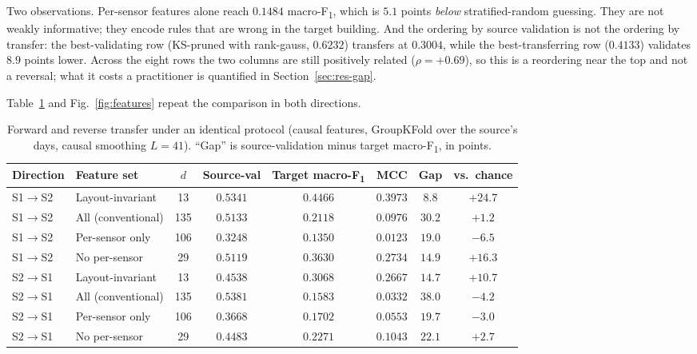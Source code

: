\documentclass[a4paper,fleqn]{cas-dc}
\newcommand{\macf}{macro-F\textsubscript{1}}
\begin{document}
Two observations. Per-sensor features alone reach $0.1484$ \macf, which is $5.1$ points
\emph{below} stratified-random guessing. They are not weakly informative; they encode
rules that are wrong in the target building. And the ordering by source validation is not
the ordering by transfer: the best-validating row (KS-pruned with rank-gauss, $0.6232$)
transfers at $0.3004$, while the best-transferring row ($0.4133$) validates $8.9$ points
lower. Across the eight rows the two columns are still positively related
($\rho=+0.69$), so this is a reordering near the top and not a reversal; what it costs a
practitioner is quantified in Section~\ref{sec:res-gap}.

Table~\ref{tab:both-dir} and Fig.~\ref{fig:features} repeat the comparison in both
directions.

\begin{table}[t]
\centering
\caption{Forward and reverse transfer under an identical protocol (causal features,
GroupKFold over the source's days, causal smoothing $L=41$). ``Gap'' is source-validation
minus target \macf, in points.}
\label{tab:both-dir}
\small
\begin{tabular}{llcccccc}
\toprule
Direction & Feature set & $d$ & Source-val & Target \macf & MCC & Gap & vs.\ chance \\
\midrule
S1$\to$S2 & Layout-invariant & 13  & $0.5341$ & $\mathbf{0.4466}$ & $0.3973$ & $8.8$  & $+24.7$ \\
S1$\to$S2 & All (conventional) & 135 & $0.5133$ & $0.2118$ & $0.0976$ & $30.2$ & $+1.2$ \\
S1$\to$S2 & Per-sensor only  & 106 & $0.3248$ & $0.1350$ & $0.0123$ & $19.0$ & $\mathbf{-6.5}$ \\
S1$\to$S2 & No per-sensor    & 29  & $0.5119$ & $0.3630$ & $0.2734$ & $14.9$ & $+16.3$ \\
\midrule
S2$\to$S1 & Layout-invariant & 13  & $0.4538$ & $\mathbf{0.3068}$ & $0.2667$ & $14.7$ & $+10.7$ \\
S2$\to$S1 & All (conventional) & 135 & $\mathbf{0.5381}$ & $0.1583$ & $0.0332$ & $38.0$ & $\mathbf{-4.2}$ \\
S2$\to$S1 & Per-sensor only  & 106 & $0.3668$ & $0.1702$ & $0.0553$ & $19.7$ & $\mathbf{-3.0}$ \\
S2$\to$S1 & No per-sensor    & 29  & $0.4483$ & $0.2271$ & $0.1043$ & $22.1$ & $+2.7$ \\
\bottomrule
\end{tabular}
\end{table}
\end{document}
